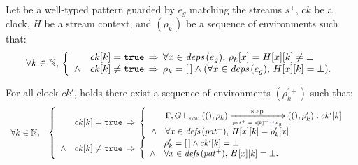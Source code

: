\begin{lemma}
    \label{lem:semantics:grsync:theorems:equivalence:pat}
    Let  be a well-typed \GRSync pattern guarded by $e_g$ matching the
    streams $s^+$, $ck$ be a clock, $H$ be a stream context, and $(\rho_k^+)$ be a sequence of
    environments such that:
    \begin{equation*}
        \forall k \in \mathbb{N}, \,
        \left\{
        \begin{array}{ll}
                   & ck[k] = \mathtt{{true}} \, \Rightarrow \, \forall x \in {\ensuremath{\textit{deps}\left(e_g\right)}}, \,
            \rho_k[x] = H[x][k] \neq \bot                                                   \\
            \wedge & ck[k] \neq \mathtt{{true}} \, \Rightarrow \,  \rho_k = [\,] \wedge (\forall
            x \in {\ensuremath{\textit{deps}\left(e_g\right)}}, \,  H[x][k] = \bot).                                          \\
        \end{array}
        \right.
    \end{equation*}

    For all clock $ck'$,  holds \iff there exist a
    sequence of environments $(\rho_k^{\prime+})$ such that:
    \begin{equation*}
        \begin{array}{ll}
            \forall k \in \N, &
            \left\{
            \begin{array}{ll}
                       & ck[k] = \true \, \Rightarrow \,
                \left\{
                \begin{array}{ll}
                           & \patOpsem{\rho_k}{\guarded{pat^+ = s[k]^+}{e_g}}{ck'[k]}{\rho'_k} \\
                    \wedge & \forall x \in \defs{pat^+}, \, H[x][k] = \rho'_k[x]               \\
                \end{array}
                \right.                                     \\
                \wedge & ck[k] \neq \true \, \Rightarrow \,
                \left\{
                \begin{array}{ll}
                           & \rho'_k = \emptyrho \wedge ck'[k] = \bot       \\
                    \wedge & \forall x \in \defs{pat^+}, \, H[x][k] = \bot. \\
                \end{array}
                \right.                                     \\
            \end{array}
            \right.
        \end{array}
    \end{equation*}
\end{lemma}
